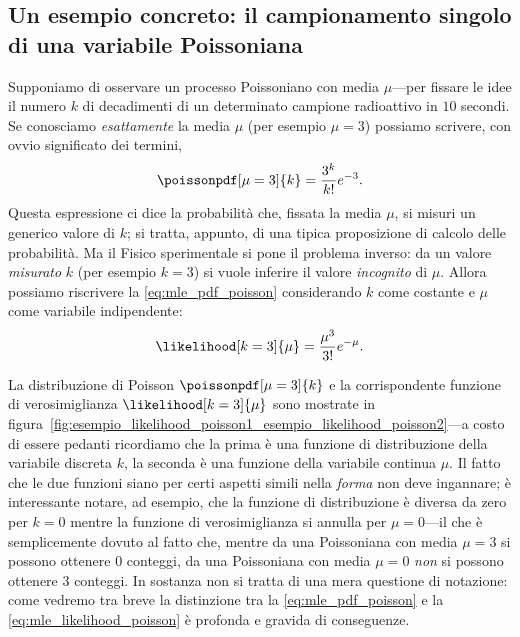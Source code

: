 \subsection{Un esempio concreto: il campionamento singolo di una variabile
  Poissoniana}

Supponiamo di osservare un processo Poissoniano con media $\mu$---per fissare
le idee il numero $k$ di decadimenti di un determinato campione radioattivo
in $10$ secondi. Se conosciamo \emph{esattamente} la media $\mu$ (per esempio
$\mu = 3$) possiamo scrivere, con ovvio significato dei termini,
\begin{align}\label{eq:mle_pdf_poisson}
  \poissonpdf[\mu = 3]{k} = \frac{3^k}{k!}e^{-3}.
\end{align}
Questa espressione ci dice la probabilità che, fissata la media $\mu$,
si misuri un generico valore di $k$; si tratta, appunto, di una tipica
proposizione di calcolo delle probabilità. Ma il Fisico sperimentale si pone
il problema inverso: da un valore \emph{misurato} $k$ (per esempio $k = 3$)
si vuole inferire il valore \emph{incognito} di $\mu$. Allora possiamo
riscrivere la \eqref{eq:mle_pdf_poisson} considerando $k$ come costante e $\mu$
come variabile indipendente:
\begin{align}\label{eq:mle_likelihood_poisson}
  \likelihood[k = 3]{\mu} = \frac{\mu^3}{3!}e^{-\mu}.
\end{align}


La distribuzione di Poisson $\poissonpdf[\mu = 3]{k}$ e la corrispondente
funzione di verosimiglianza $\likelihood[k = 3]{\mu}$ sono mostrate in
figura~\ref{fig:esempio_likelihood_poisson1_esempio_likelihood_poisson2}---a
costo di essere pedanti ricordiamo che la prima è una funzione di
distribuzione della variabile discreta $k$, la seconda è una funzione della
variabile continua $\mu$. Il fatto che le due funzioni siano per certi aspetti
simili nella \emph{forma} non deve ingannare; è interessante notare, ad
esempio, che la funzione di distribuzione è diversa da zero per $k = 0$
mentre la funzione di verosimiglianza si annulla per $\mu = 0$---il che è
semplicemente dovuto al fatto che, mentre da una Poissoniana con media $\mu = 3$
si possono ottenere $0$ conteggi, da una Poissoniana con media $\mu = 0$
\emph{non} si possono ottenere  $3$ conteggi.
In sostanza non si tratta di una mera questione di notazione: come vedremo tra
breve la distinzione tra la \eqref{eq:mle_pdf_poisson} e la
\eqref{eq:mle_likelihood_poisson} è profonda e gravida di conseguenze.

